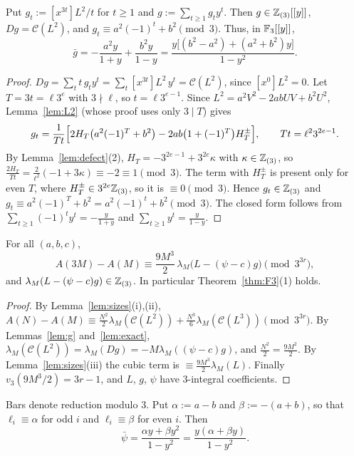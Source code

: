 \documentclass[11pt]{amsart}
\begin{document}
\begin{lemma}\label{lem:g}
Put $g_t:=[x^{3t}]L^2/t$ for $t\ge1$ and $g:=\sum_{t\ge1}g_ty^t$. Then $g\in\mathbb{Z}_{(3)}[[y]]$, $Dg=\mathcal C(L^2)$, and $g_t\equiv a^2(-1)^t+b^2\pmod3$. Thus, in $\mathbb{F}_3[[y]]$,
\[ \bar g=-\frac{a^2y}{1+y}+\frac{b^2y}{1-y}=\frac{y\bigl[(b^2-a^2)+(a^2+b^2)y\bigr]}{1-y^2}. \]
\end{lemma}
\begin{proof}
$Dg=\sum_tt\,g_ty^t=\sum_t[x^{3t}]L^2\,y^t=\mathcal C(L^2)$, since $[x^0]L^2=0$. Let $T=3t=\ell3^e$ with $3\nmid\ell$, so $t=\ell3^{e-1}$. Since $L^2=a^2V^2-2abUV+b^2U^2$, Lemma~\ref{lem:L2} (whose proof uses only $3\mid T$) gives
\[ g_t=\frac1{Tt}\Bigl[2H_T\bigl(a^2(-1)^T+b^2\bigr)-2ab\bigl(1+(-1)^T\bigr)H_T^\pm\Bigr],\qquad Tt=\ell^23^{2e-1}. \]
By Lemma~\ref{lem:defect}(2), $H_T=-3^{2e-1}+3^{2e}\kappa$ with $\kappa\in\mathbb{Z}_{(3)}$, so $\frac{2H_T}{Tt}=\frac2{\ell^2}(-1+3\kappa)\equiv-2\equiv1\pmod 3$. The term with $H_T^\pm$ is present only for even $T$, where $H_T^\pm\in3^{2e}\mathbb{Z}_{(3)}$, so it is $\equiv0\pmod3$. Hence $g_t\in\mathbb{Z}_{(3)}$ and $g_t\equiv a^2(-1)^T+b^2=a^2(-1)^t+b^2\pmod3$. The closed form follows from $\sum_{t\ge1}(-1)^ty^t=-\frac y{1+y}$ and $\sum_{t\ge1}y^t=\frac y{1-y}$.
\end{proof}

\begin{proposition}[reduction]\label{prop:red}
For all $(a,b,c)$,
\[ A(3M)-A(M)\equiv\frac{9M^3}2\,\lambda_M\bigl(L-(\psi-c)g\bigr)\pmod{3^{3r}}, \]
and $\lambda_M(L-(\psi-c)g)\in\mathbb{Z}_{(3)}$. In particular Theorem~\ref{thm:F3}(1) holds.
\end{proposition}
\begin{proof}
By Lemma~\ref{lem:sizes}(i),(ii), $A(N)-A(M)\equiv\frac{N^2}2\lambda_M(\mathcal C(L^2))+\frac{N^3}6\lambda_M(\mathcal C(L^3))\pmod{3^{3r}}$. By Lemmas~\ref{lem:g} and~\ref{lem:exact}, $\lambda_M(\mathcal C(L^2))=\lambda_M(Dg)=-M\lambda_M((\psi-c)g)$, and $\frac{N^2}2=\frac{9M^2}2$. By Lemma~\ref{lem:sizes}(iii) the cubic term is $\equiv\frac{9M^3}2\lambda_M(L)$. Finally $v_3(9M^3/2)=3r-1$, and $L$, $g$, $\psi$ have $3$-integral coefficients.
\end{proof}

Bars denote reduction modulo $3$. Put $\alpha:=a-b$ and $\beta:=-(a+b)$, so that $\ell_i\equiv\alpha$ for odd $i$ and $\ell_i\equiv\beta$ for even $i$. Then
\[ \bar\psi=\frac{\alpha y+\beta y^2}{1-y^2}=\frac{y(\alpha+\beta y)}{1-y^2}. \]
\end{document}
